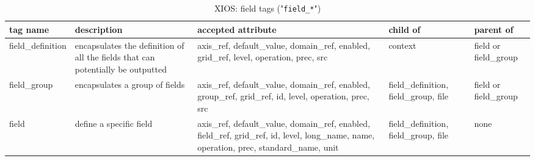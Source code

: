 \documentclass[../main/NEMO_manual]{subfiles}
\begin{document}
\begin{table}
  \begin{tabularx}{\textwidth}{|l|X|X|X|l|}
    \hline
    tag name                                                                                &
    description                                                                             &
    accepted attribute                                                                      &
    child of                                                                                &
    parent of             \\
    \hline
    \hline
    field\_definition                                                                       &
    encapsulates the definition of all the fields that can potentially be outputted         &
    axis\_ref, default\_value, domain\_ref, enabled, grid\_ref, level, operation, prec, src &
    context                                                                                 &
    field or field\_group \\
    \hline
    field\_group                                                                            &
    encapsulates a group of fields                                                          &
    axis\_ref, default\_value, domain\_ref, enabled, group\_ref, grid\_ref,
    id, level, operation, prec, src                                                         &
    field\_definition, field\_group, file                                                   &
    field or field\_group \\
    \hline
    field                                                                                   &
    define a specific field                                                                 &
    axis\_ref, default\_value, domain\_ref, enabled, field\_ref, grid\_ref,
    id, level, long\_name, name, operation, prec, standard\_name, unit                      &
    field\_definition, field\_group, file                                                   &
    none                  \\
    \hline
  \end{tabularx}
  \caption{XIOS: field tags ("\texttt{field\_*}")}
\end{table}
\end{document}
